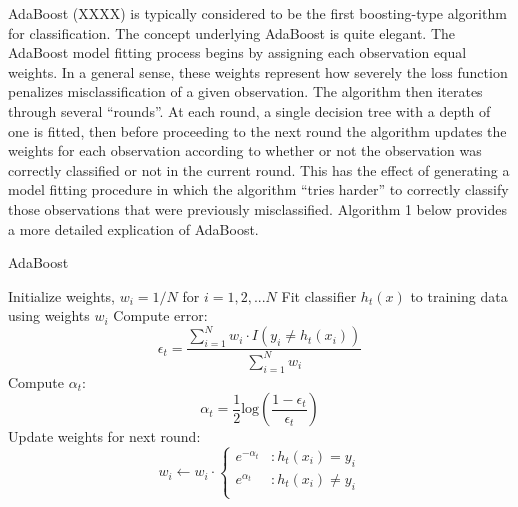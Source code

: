 \documentclass[10pt]{article}
\begin{document}
AdaBoost (XXXX) is typically considered to be the first boosting-type algorithm for classification. The concept underlying AdaBoost is quite elegant. The AdaBoost model fitting process begins by assigning each observation equal weights. In a general sense, these weights represent how severely the loss function penalizes misclassification of a given observation. The algorithm then iterates through several ``rounds''. At each round, a single decision tree with a depth of one is fitted, then before proceeding to the next round the algorithm updates the weights for each observation according to whether or not the observation was correctly classified or not in the current round. This has the effect of generating a model fitting procedure in which the algorithm ``tries harder'' to correctly classify those observations that were previously misclassified. Algorithm 1 below provides a more detailed explication of AdaBoost.

 




\begin{algorithm}
\caption{AdaBoost}\label{adaboost}
\begin{algorithmic}[1]

		\State Initialize weights, $w_i = 1/N$ for $i = 1, 2, ... N$
			\State Fit classifier $h_t(x)$ to training data using weights $w_i$
			\State Compute error: 
				\State $$\epsilon_t = \frac{\sum_{i=1}^{N} w_i \cdot I(y_i \ne h_t(x_i))}{\sum_{i = 1}^{N} w_i}$$
			\State Compute $\alpha_t$:
				\State $$\alpha_t = \frac{1}{2} \text{log} \left(\frac{1 - \epsilon_t}{\epsilon_t} \right)$$
			\State Update weights for next round:
				\State \[ w_i \gets w_i \cdot \left\{ \begin{array}{lr}
				                                                        e^{-\alpha_t} & : h_t(x_i) = y_i \\
				                                                        e^{\alpha_t} & : h_t(x_i) \ne y_i \\
				                                                      \end{array}
				                                            \right.
				          \]
		\EndFor
	\EndProcedure
\end{algorithmic}
\end{algorithm}
\end{document}
